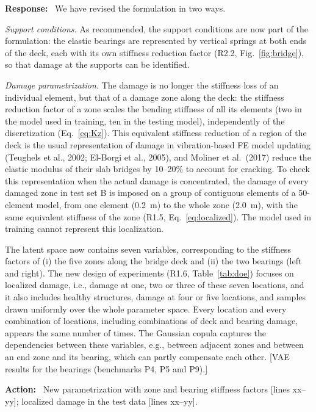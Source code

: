 \documentclass[11pt]{article}
\newenvironment{response}{\par\smallskip\noindent\color{resp}\textbf{Response:}\ }{\par}
\newenvironment{action}{\par\smallskip\noindent\color{resp}\textbf{Action:}\ }{\par}
\newcommand{\tbd}[1]{\textcolor{note}{\textsf{[#1]}}}
\newcommand{\lines}[1]{\tbd{lines #1}}
\begin{document}
\begin{response}
We have revised the formulation in two ways.

\textit{Support conditions.} As recommended, the support conditions are now part of the formulation: the elastic bearings
are represented by vertical springs at both ends of the deck, each with its own stiffness reduction factor (R2.2,
Fig.~\ref{fig:bridge}), so that damage at the supports can be identified.

\textit{Damage parametrization.} The damage is no longer the stiffness loss of an individual element, but that of a damage
zone along the deck: the stiffness reduction factor of a zone scales the bending stiffness of all its elements (two in the
model used in training, ten in the testing model), independently of the discretization (Eq.~\eqref{eq:Kz}). This
equivalent stiffness reduction of a region of the deck is the usual representation of damage in vibration-based FE model
updating (Teughels et al., 2002; El-Borgi et al., 2005), and Moliner et al.\ (2017) reduce the elastic modulus of their
slab bridges by 10--20\% to account for cracking. To check this representation when the actual damage is concentrated,
the damage of every damaged zone in test set B is imposed on a group of contiguous elements of a 50-element model, from one
element (0.2~m) to the whole zone (2.0~m), with the same equivalent stiffness of the zone (R1.5, Eq.~\eqref{eq:localized}).
The model used in training cannot represent this localization.

The latent space now contains seven variables, corresponding to the stiffness factors of (i) the five zones along the
bridge deck and (ii) the two bearings (left and right). The new design of experiments (R1.6, Table~\ref{tab:doe}) focuses
on localized damage, i.e., damage at one, two or three of these seven locations, and it also includes healthy structures,
damage at four or five locations, and samples drawn uniformly over the whole parameter space. Every location and every
combination of locations, including combinations of deck and bearing damage, appears the same number of times. The
Gaussian copula captures the dependencies between these variables, e.g., between adjacent zones and between an end zone
and its bearing, which can partly compensate each other.
\tbd{VAE results for the bearings (benchmarks P4, P5 and P9).}
\end{response}

\begin{action}
New parametrization with zone and bearing stiffness factors \lines{xx--yy}; localized damage in the test data
\lines{xx--yy}.
\end{action}
\end{document}

